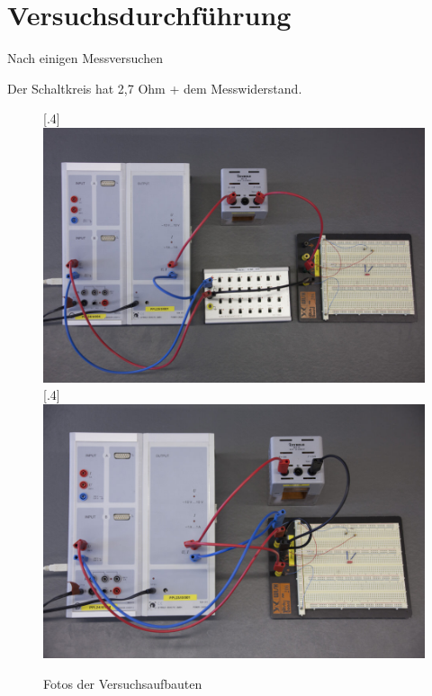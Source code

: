 \section{Versuchsdurchführung}
Nach einigen Messversuchen


Der Schaltkreis hat 2,7 Ohm + dem Messwiderstand.



\begin{figure}
\centering
    [.4\linewidth]
            {\includegraphics[width=.4\textwidth]{images/durchlassfilter}}
    [.4\linewidth]
            {\includegraphics[width=.4\textwidth]{images/sperrfilter}}
\caption{Fotos der Versuchsaufbauten}
\end{figure}

